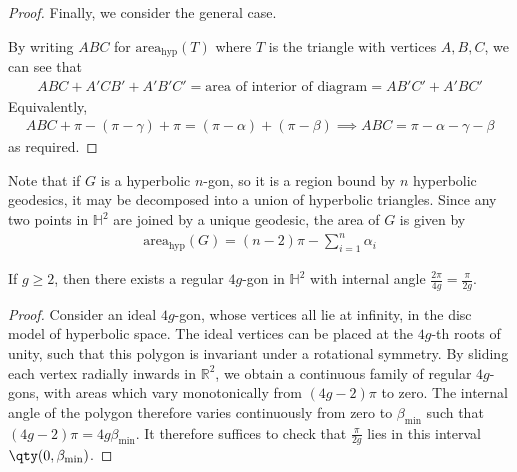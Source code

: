 \begin{proof}
	Finally, we consider the general case.
	\begin{center}
	\end{center}
	By writing $ABC$ for $\mathrm{area}_{\text{hyp}}(T)$ where $T$ is the triangle with vertices $A, B, C$, we can see that
	\begin{align*}
		ABC + A'CB' + A'B'C' =  \text{area of interior of diagram} = AB'C' + A'BC'
	\end{align*}
	Equivalently,
	\begin{align*}
		ABC + \pi - (\pi - \gamma) + \pi = (\pi - \alpha) + (\pi - \beta) \implies ABC = \pi - \alpha - \gamma - \beta
	\end{align*}
	as required.
\end{proof}
Note that if $G$ is a hyperbolic $n$-gon, so it is a region bound by $n$ hyperbolic geodesics, it may be decomposed into a union of hyperbolic triangles.
Since any two points in $\mathbb H^2$ are joined by a unique geodesic, the area of $G$ is given by
\begin{align*}
	\mathrm{area}_{\text{hyp}}(G) = (n-2)\pi - \sum_{i=1}^n \alpha_i
\end{align*}
\begin{lemma}
	If $g \geq 2$, then there exists a regular $4g$-gon in $\mathbb H^2$ with internal angle $\frac{2\pi}{4g} = \frac{\pi}{2g}$.
\end{lemma}
\begin{proof}
	Consider an ideal $4g$-gon, whose vertices all lie at infinity, in the disc model of hyperbolic space.
	The ideal vertices can be placed at the $4g$-th roots of unity, such that this polygon is invariant under a rotational symmetry.
	By sliding each vertex radially inwards in $\mathbb R^2$, we obtain a continuous family of regular $4g$-gons, with areas which vary monotonically from $(4g-2)\pi$ to zero.
	The internal angle of the polygon therefore varies continuously from zero to $\beta_{\min}$ such that $(4g-2)\pi = 4g \beta_{\min}$.
	It therefore suffices to check that $\frac{\pi}{2g}$ lies in this interval $\qty(0,\beta_{\min})$.
\end{proof}

